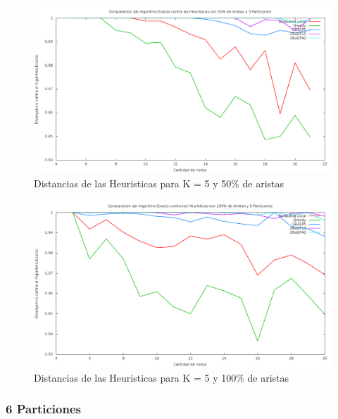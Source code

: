 \begin{figure}[H]
\begin{center}
\includegraphics[scale=0.3]{finales/ComparacionesCon5Particiones50Aristas.png}
\caption{Distancias de las Heuristicas para K = 5 y 50\% de aristas}
\end{center}
\end{figure}

\begin{figure}[H]
\begin{center}
\includegraphics[scale=0.3]{finales/ComparacionesCon5Particiones100Aristas.png}
\caption{Distancias de las Heuristicas para K = 5 y 100\% de aristas}
\end{center}
\end{figure}

\subsubsection{6 Particiones}

